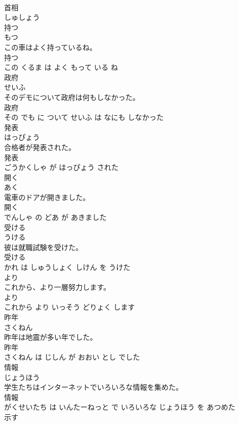 \documentclass[8pt]{extreport}
\begin{document}
\begin{CJK}{UTF8}{min}
\\	首相	
\\	しゅしょう			
\\	持つ	
\\	もつ			
\\	この車はよく持っているね。	
\\	持つ 
\\	この くるま は よく もって いる ね			
\\	政府	
\\	せいふ			
\\	そのデモについて政府は何もしなかった。	
\\	政府 
\\	その でも に ついて せいふ は なにも しなかった			
\\	発表	
\\	はっぴょう			
\\	合格者が発表された。	
\\	発表 
\\	ごうかくしゃ が はっぴょう された			
\\	開く	
\\	あく			
\\	電車のドアが開きました。	
\\	開く 
\\	でんしゃ の どあ が あきました			
\\	受ける	
\\	うける			
\\	彼は就職試験を受けた。	
\\	受ける 
\\	かれ は しゅうしょく しけん を うけた			
\\	より	
\\	これから、より一層努力します。	
\\	より 
\\	これから より いっそう どりょく します			
\\	昨年	
\\	さくねん			
\\	昨年は地震が多い年でした。	
\\	昨年 
\\	さくねん は じしん が おおい とし でした			
\\	情報	
\\	じょうほう			
\\	学生たちはインターネットでいろいろな情報を集めた。	
\\	情報 
\\	がくせいたち は いんたーねっと で いろいろな じょうほう を あつめた			
\\	示す	

\end{CJK}
\end{document}
